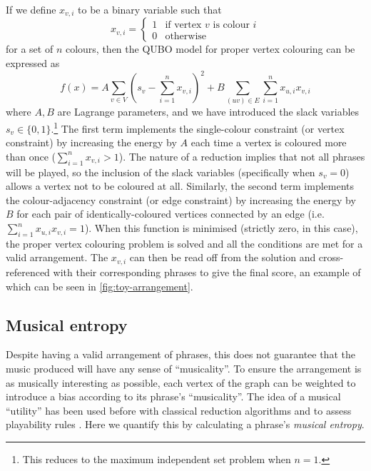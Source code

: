 \documentclass[twocolumn]{article}
\theoremstyle{definition}
\begin{document}
If we define $x_{v,i}$ to be a binary variable such that
\begin{equation}
    x_{v,i} =
    \begin{cases}
        1 & \text{if vertex $v$ is colour $i$} \\
        0 & \text{otherwise}
    \end{cases}
\end{equation}
for a set of $n$ colours, then the QUBO model for proper vertex colouring can be expressed as
\begin{equation}
    f(x)=A\sum_{v \in V}\left(s_v-\sum_{i=1}^{n} x_{v,i}\right)^2+B\sum_{(uv) \in E}\sum_{i=1}^n x_{u,i}x_{v,i}
    \label{eq:colouring}
\end{equation}
where $A,B$ are Lagrange parameters, and we have introduced the slack variables $s_v\in\{0,1\}$.\footnote{This reduces to the maximum independent set problem when $n=1$.} The first term implements the single-colour constraint (or vertex constraint) by increasing the energy by $A$ each time a vertex is coloured more than once ($\sum_{i=1}^{n} x_{v,i}>1$). The nature of a reduction implies that not all phrases will be played, so the inclusion of the slack variables (specifically when $s_v=0$) allows a vertex not to be coloured at all. Similarly, the second term implements the colour-adjacency constraint (or edge constraint) by increasing the energy by $B$ for each pair of identically-coloured vertices connected by an edge (i.e.\ $\sum_{i=1}^n x_{u,i}x_{v,i}=1$). When this function is minimised (strictly zero, in this case), the proper vertex colouring problem is solved and all the conditions are met for a valid arrangement. The $x_{v,i}$ can then be read off from the solution and cross-referenced with their corresponding phrases to give the final score, an example of which can be seen in \cref{fig:toy-arrangement}.

\subsection{Musical entropy}

Despite having a valid arrangement of phrases, this does not guarantee that the music produced will have any sense of ``musicality''. To ensure the arrangement is as musically interesting as possible, each vertex of the graph can be weighted to introduce a bias according to its phrase's ``musicality''. The idea of a musical ``utility'' has been used before with classical reduction algorithms \cite{huang_towards_2012} and to assess playability rules \cite{chiu_automatic_2009}. Here we quantify this by calculating a phrase's \emph{musical entropy}.
\end{document}
